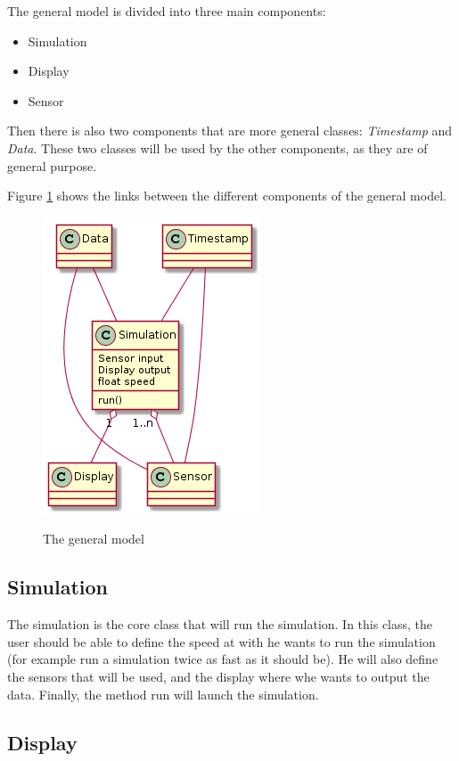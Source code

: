 

The general model is divided into three main components:
\begin{itemize}
\item Simulation
\item Display
\item Sensor
\end{itemize}

Then there is also two components that are more general classes: \emph{Timestamp} and \emph{Data}. These two classes will be used by the other components, as they are of general purpose.

Figure \ref{meta-meta-model} shows the links between the different components of the general model.

\begin{figure}
  \centering
  \includegraphics[scale = 0.5]{figures/meta-meta-model.png}
  \label{meta-meta-model}
  \caption{The general model}
\end{figure}

\subsection{Simulation}

The simulation is the core class that will run the simulation. In this class, the user should be able to define the speed at with he wants to run the simulation (for example run a simulation twice as fast as it should be). He will also define the sensors that will be used, and the display where whe wants to output the data. Finally, the method run will launch the simulation.


\subsection{Display}

